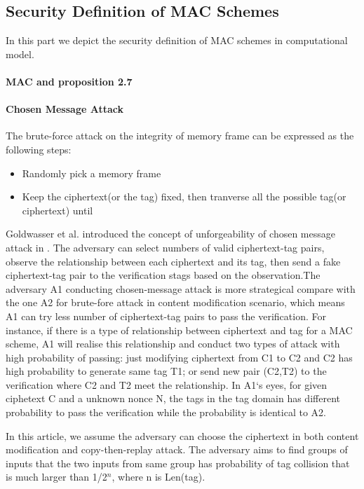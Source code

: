 \documentclass{article}
\begin{document}
\subsection{Security Definition of MAC Schemes}
In this part we depict the security definition of MAC schemes in computational model.  
\paragraph{MAC and proposition 2.7}
\paragraph{Chosen Message Attack}
The brute-force attack on the integrity of memory frame can be expressed as the following steps:
\begin{itemize}
	\item Randomly pick a memory frame
	\item Keep the ciphertext(or the tag) fixed, then tranverse all the possible tag(or ciphertext) until
\end{itemize}

Goldwasser et al. introduced the concept of unforgeability of chosen message attack in \cite{}. The adversary can select numbers of valid ciphertext-tag pairs, observe the relationship between each ciphertext and its tag, then send a fake ciphertext-tag pair to the verification stags based on the observation.The adversary A1 conducting chosen-message attack is more strategical compare with the one A2 for brute-fore attack in content modification scenario, which means A1 can try less number of ciphertext-tag pairs to pass the verification. 
For instance, if there is a type of relationship between ciphertext and tag for a MAC scheme, A1 will realise this relationship and conduct two types of attack with high probability of passing: just modifying ciphertext from C1 to C2 and C2 has high probability to generate same tag T1; or send new pair (C2,T2) to the verification where C2 and T2 meet the relationship. In A1`s eyes, for given ciphetext C and a unknown nonce N, the tags in the tag domain has different probability to pass the verification while the probability is identical to A2. 

In this article, we assume the adversary can choose the ciphertext in both content modification and copy-then-replay attack. The adversary aims to find groups of inputs that the two inputs from same group has probability of tag collision that is much larger than 1/2$^n$, where n is Len(tag). 
\end{document}
